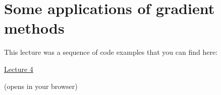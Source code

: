 \section{Some applications of gradient methods}

This lecture was a sequence of code examples that you can find here:

\begin{center}
{\Large
\href{https://ee227c.github.io/code/lecture4.html}{Lecture 4}
}

(opens in your browser)
\end{center}


